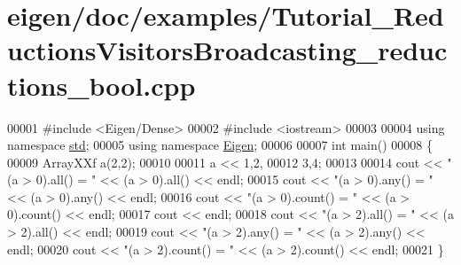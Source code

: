 \hypertarget{eigen_2doc_2examples_2_tutorial___reductions_visitors_broadcasting__reductions__bool_8cpp_source}{}\section{eigen/doc/examples/\+Tutorial\+\_\+\+Reductions\+Visitors\+Broadcasting\+\_\+reductions\+\_\+bool.cpp}
\label{eigen_2doc_2examples_2_tutorial___reductions_visitors_broadcasting__reductions__bool_8cpp_source}

\begin{DoxyCode}
00001 \textcolor{preprocessor}{#include <Eigen/Dense>}
00002 \textcolor{preprocessor}{#include <iostream>}
00003 
00004 \textcolor{keyword}{using namespace }\hyperlink{namespacestd}{std};
00005 \textcolor{keyword}{using namespace }\hyperlink{namespace_eigen}{Eigen};
00006 
00007 \textcolor{keywordtype}{int} main()
00008 \{
00009   ArrayXXf a(2,2);
00010   
00011   a << 1,2,
00012        3,4;
00013 
00014   cout << \textcolor{stringliteral}{"(a > 0).all()   = "} << (a > 0).all() << endl;
00015   cout << \textcolor{stringliteral}{"(a > 0).any()   = "} << (a > 0).any() << endl;
00016   cout << \textcolor{stringliteral}{"(a > 0).count() = "} << (a > 0).count() << endl;
00017   cout << endl;
00018   cout << \textcolor{stringliteral}{"(a > 2).all()   = "} << (a > 2).all() << endl;
00019   cout << \textcolor{stringliteral}{"(a > 2).any()   = "} << (a > 2).any() << endl;
00020   cout << \textcolor{stringliteral}{"(a > 2).count() = "} << (a > 2).count() << endl;
00021 \}
\end{DoxyCode}
